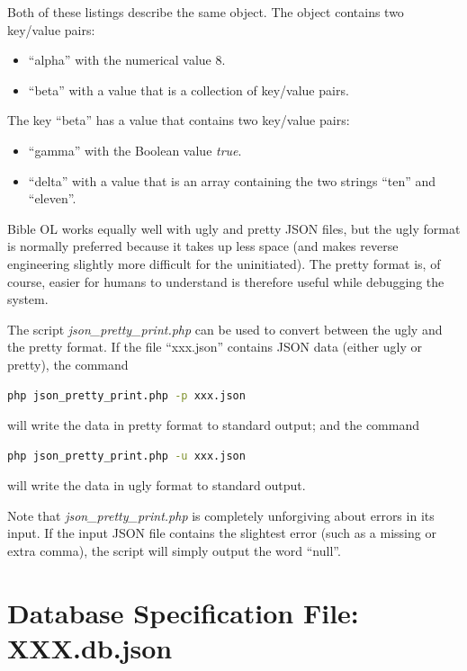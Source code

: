 \documentclass[11pt,oneside,a4paper]{memoir}
\begin{document}
Both of these listings describe the same object. The object contains two key/value pairs:

\begin{itemize}
\item ``alpha'' with the numerical value 8.
\item ``beta'' with a value that is a collection of key/value pairs.
\end{itemize}

The key ``beta'' has a value that contains two key/value pairs:

\begin{itemize}
\item ``gamma'' with the Boolean value \emph{true}.
\item ``delta'' with a value that is an array containing the two strings ``ten'' and ``eleven''.
\end{itemize}


Bible OL works equally well with ugly and pretty JSON files, but the ugly format is normally
preferred because it takes up less space (and makes reverse engineering slightly more difficult for
the uninitiated). The pretty format is, of course, easier for humans to understand is therefore useful
while debugging the system.

The script \emph{json\_pretty\_print.php} can be used to convert between the ugly and the pretty
format. If the file ``xxx.json'' contains JSON data (either ugly or pretty), the command

\begin{lstlisting}[language=bash]
php json_pretty_print.php -p xxx.json
\end{lstlisting}

\noindent
will write the data in pretty format to standard output; and the command

\begin{lstlisting}[language=bash]
php json_pretty_print.php -u xxx.json
\end{lstlisting}

\noindent
will write the data in ugly format to standard output.

Note that \emph{json\_pretty\_print.php} is completely unforgiving about errors in its input. If the
input JSON file contains the slightest error (such as a missing or extra comma), the script will
simply output the word ``null''.


\section{Database Specification File: XXX.db.json}\label{dsf}
\end{document}
